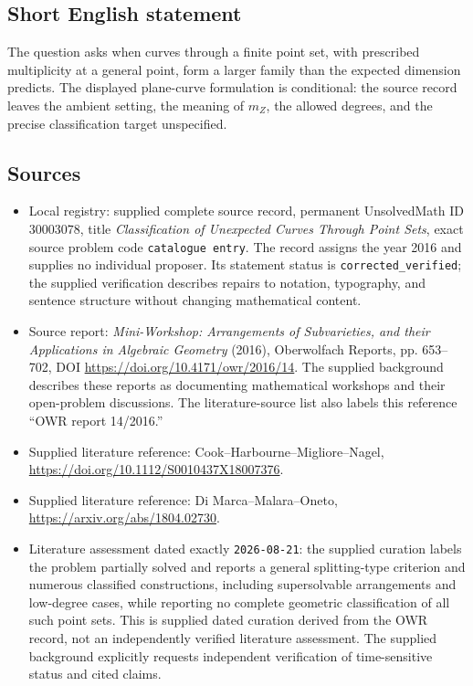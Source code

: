 \documentclass[11pt]{article}
\begin{document}
\subsection{Short English statement}
The question asks when curves through a finite point set, with prescribed multiplicity at a general point, form a larger family than the expected dimension predicts. The displayed plane-curve formulation is conditional: the source record leaves the ambient setting, the meaning of \(m_Z\), the allowed degrees, and the precise classification target unspecified.
\subsection{Sources}
\begin{itemize}
\item Local registry: supplied complete source record, permanent UnsolvedMath ID \(30003078\), title \emph{Classification of Unexpected Curves Through Point Sets}, exact source problem code \texttt{catalogue entry}. The record assigns the year 2016 and supplies no individual proposer. Its statement status is \texttt{corrected\_verified}; the supplied verification describes repairs to notation, typography, and sentence structure without changing mathematical content.
\item Source report: \emph{Mini-Workshop: Arrangements of Subvarieties, and their Applications in Algebraic Geometry} (2016), Oberwolfach Reports, pp. 653--702, DOI \url{https://doi.org/10.4171/owr/2016/14}. The supplied background describes these reports as documenting mathematical workshops and their open-problem discussions. The literature-source list also labels this reference ``OWR report 14/2016.''
\item Supplied literature reference: Cook--Harbourne--Migliore--Nagel, \url{https://doi.org/10.1112/S0010437X18007376}.
\item Supplied literature reference: Di Marca--Malara--Oneto, \url{https://arxiv.org/abs/1804.02730}.
\item Literature assessment dated exactly \texttt{2026-08-21}: the supplied curation labels the problem partially solved and reports a general splitting-type criterion and numerous classified constructions, including supersolvable arrangements and low-degree cases, while reporting no complete geometric classification of all such point sets. This is supplied dated curation derived from the OWR record, not an independently verified literature assessment. The supplied background explicitly requests independent verification of time-sensitive status and cited claims.
\end{itemize}
\end{document}
